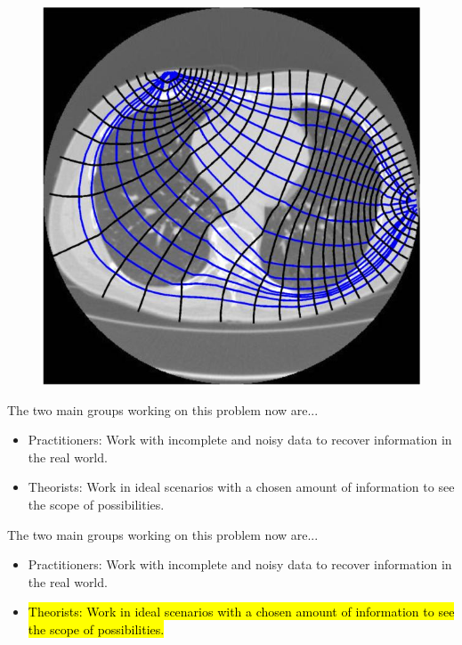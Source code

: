 \documentclass[aspectratio=169]{beamer}
\makeatletter
\let\HL\hl
\renewcommand\hl{%
  \let\set@color\beamerorig@set@color
  \let\reset@color\beamerorig@reset@color
  \HL}
\makeatother
\begin{document}
\begin{frame}{}
\vfill
\begin{figure}[H]
    \centering
    \includegraphics[width=.5\textwidth]{eit.jpg}
\end{figure}
\vfill
\end{frame}

\begin{frame}{}
\vfill
The two main groups working on this problem now are... 
\pause
    \begin{itemize}
        \item Practitioners: Work with incomplete and noisy data to recover information in the real world.
        
        \pause
        \item Theorists: Work in ideal scenarios with a chosen amount of information to see the scope of possibilities.
    \end{itemize}
\vfill    
\end{frame}

\begin{frame}{}
\vfill
The two main groups working on this problem now are... 
    \begin{itemize}
        \item Practitioners: Work with incomplete and noisy data to recover information in the real world.
        
        \item \hl{Theorists: Work in ideal scenarios with a chosen amount of information to see the scope of possibilities.}
    \end{itemize}
\vfill
\end{frame}
\end{document}
